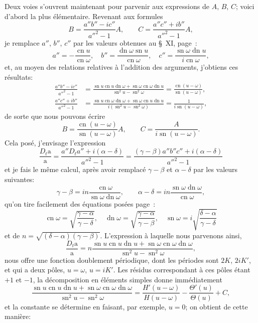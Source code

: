 \documentclass[11pt,leqno,oneside,letterpaper]{book}[2005/09/16]
\DeclareMathOperator{\sn}{sn}
\DeclareMathOperator{\cn}{cn}
\DeclareMathOperator{\dn}{dn}
\begin{document}
Deux voies s'ouvrent maintenant pour parvenir aux expressions
de $A$, $B$, $C$; voici d'abord la plus \'el\'ementaire. Revenant aux formules
\[
  B = \frac{a''b''-ic''}{a''^2-1} A, \qquad
  C = \frac{a''c''+ib''}{a''^2-1} A,
\]
je remplace $a''$, $b''$, $c''$ par les valeurs obtenues au \S~XI, page~\pageref{page27}:
\[
  a'' = -\frac{          \cn u}{ \cn\omega}, \quad
  b'' =  \frac{\dn\omega \sn u}{ \cn\omega}, \quad
  c'' =  \frac{\sn\omega \dn u}{i\cn\omega},
\]
et, au moyen des relations relatives \`a l'addition des arguments, j'obtiens
ces r\'esultats:
\begin{align*}
  \frac{a'' b'' - ic''}{a''^2-1} &=
  \frac{\sn u \cn u \dn\omega + \sn\omega\cn\omega\dn u}{\sn^2 u - \sn^2\omega}
  = \frac{\cn(u-\omega)}{\sn(u-\omega)}, \\
  \frac{a'' c'' + ib''}{a''^2-1} &=
  \frac{\sn u \cn\omega\dn\omega + \sn\omega\cn u \dn u}{i(\sn^2 u - \sn^2\omega)}
  = \frac{1}{i\sn(u-\omega)},
\end{align*}
de sorte que nous pouvons \'ecrire
\[
  B=\frac{\cn(u-\omega)}{\sn(u-\omega)} A, \qquad
  C=\frac{A}{i\sn(u-\omega)} .
\]
Cela pos\'e, j'envisage l'expression
\[
  \frac{D_t\mathrm{a}}{\mathrm{a}} =
  \frac{a'' D_t a'' + i(\alpha-\delta)}{a''^2-1} =
  \frac{(\gamma-\beta)a''b''c'' + i(\alpha-\delta)}{a''^2 - 1}
\]
et je fais le m\^eme calcul, apr\`es avoir remplac\'e $\gamma-\beta$ et $\alpha-\delta$ par les
valeurs suivantes:
\[
  \gamma-\beta = in\frac{\cn\omega}{\sn\omega\dn\omega}, \qquad
  \alpha-\delta= in\frac{\sn\omega\dn\omega}{\cn\omega},
\]
qu'on tire facilement des \'equations pos\'ees page~\pageref{page26}:
\[
  \cn\omega = \sqrt{\frac{\gamma-\alpha}{\gamma-\delta}}, \quad
  \dn\omega = \sqrt{\frac{\gamma-\alpha}{\gamma-\beta}},  \quad
  \sn\omega =i\sqrt{\frac{\delta-\alpha}{\gamma-\delta}}
\]
et de $n=\sqrt{(\delta-\alpha)(\gamma-\beta)}$. L'expression \`a laquelle nous parvenons ainsi,
\[
  \frac{D_t\mathrm{a}}{\mathrm{a}} =
  n \frac{\sn u \cn u \dn u + \sn\omega\cn\omega\dn\omega}{\sn^2 u - \sn^2 \omega},
\]
nous offre une fonction doublement p\'eriodique, dont les p\'eriodes
sont $2K$, $2iK'$, et qui a deux p\^oles, $u = \omega$, $u = iK'$. Les r\'esidus correspondant
\`a ces p\^oles \'etant $+1$ et $-1$, la d\'ecomposition en \'el\'ements simples
donne imm\'ediatement
\[
  \frac{\sn u \cn u \dn u + \sn\omega\cn\omega\dn\omega}{\sn^2 u - \sn^2 \omega}
  =  \frac{H'(u-\omega)}{H(u-\omega)} - \frac{\Theta'(u)}{\Theta(u)} + C,
\]
et la constante se d\'etermine en faisant, par exemple, $u=0$; on obtient
de cette mani\`ere:
\end{document}
